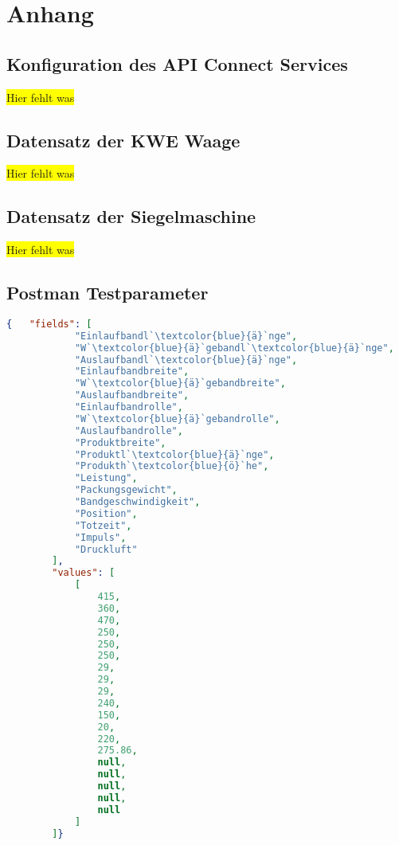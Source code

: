 \chapter{Anhang}
\label{ch:anhang}

\section{Konfiguration des API Connect Services}
\label{sec:konfigurationAPIConnect}
\colorbox{yellow}{Hier fehlt was}

\section{Datensatz der KWE Waage}
\label{sec:scaleData}
\colorbox{yellow}{Hier fehlt was}

\section{Datensatz der Siegelmaschine}
\label{sec:hariboSiegel}
\colorbox{yellow}{Hier fehlt was}

\newpage

\section{Postman Testparameter}
\label{sec:postmanTestparameter}

\begin{lstlisting}[language=json, caption=Testparameter für Postman, label=ls:anhang_postman, escapeinside=``]
    {   "fields": [
            "Einlaufbandl`\textcolor{blue}{ä}`nge",
            "W`\textcolor{blue}{ä}`gebandl`\textcolor{blue}{ä}`nge",
            "Auslaufbandl`\textcolor{blue}{ä}`nge",
            "Einlaufbandbreite",
            "W`\textcolor{blue}{ä}`gebandbreite",
            "Auslaufbandbreite",
            "Einlaufbandrolle",
            "W`\textcolor{blue}{ä}`gebandrolle",
            "Auslaufbandrolle",
            "Produktbreite",
            "Produktl`\textcolor{blue}{ä}`nge",
            "Produkth`\textcolor{blue}{ö}`he",
            "Leistung",
            "Packungsgewicht",
            "Bandgeschwindigkeit",
            "Position",
            "Totzeit",
            "Impuls",
            "Druckluft"
        ],
        "values": [
            [
                415,
                360,
                470,
                250,
                250,
                250,
                29,
                29,
                29,
                240,
                150,
                20,
                220,
                275.86,
                null,
                null,
                null,
                null,
                null
            ]
        ]}
\end{lstlisting}

